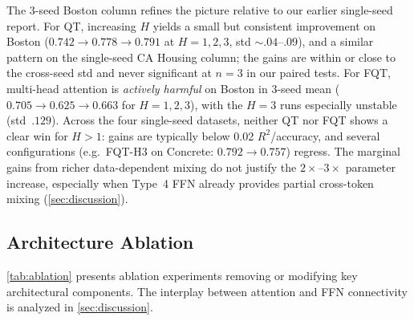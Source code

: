\documentclass[10pt,conference]{IEEEtran}
\begin{document}
The 3-seed Boston column refines the picture relative to our earlier single-seed report.
For QT, increasing $H$ yields a small but consistent improvement on Boston ($0.742\!\to\!0.778\!\to\!0.791$ at $H{=}1,2,3$, std ${\sim}.04$--$.09$), and a similar pattern on the single-seed CA Housing column; the gains are within or close to the cross-seed std and never significant at $n{=}3$ in our paired tests.
For FQT, multi-head attention is \emph{actively harmful} on Boston in 3-seed mean ($0.705\!\to\!0.625\!\to\!0.663$ for $H{=}1,2,3$), with the $H{=}3$ runs especially unstable (std~$.129$).
Across the four single-seed datasets, neither QT nor FQT shows a clear win for $H{>}1$: gains are typically below 0.02 $R^2$/accuracy, and several configurations (e.g.\ FQT-H3 on Concrete: $0.792\!\to\!0.757$) regress.
The marginal gains from richer data-dependent mixing do not justify the $2{\times}$--$3{\times}$ parameter increase, especially when Type~4 FFN already provides partial cross-token mixing (\cref{sec:discussion}).

\subsection{Architecture Ablation}
\label{sec:results-ablation}

\cref{tab:ablation} presents ablation experiments removing or modifying key architectural components.
The interplay between attention and FFN connectivity is analyzed in \cref{sec:discussion}.
\end{document}
